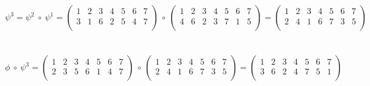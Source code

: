 $\psi^{3} = \psi^{2} \ \circ \ \psi^{1} = 
\begin{pmatrix}
1 & 2 & 3 & 4 & 5 & 6 & 7\\
3 & 1 & 6 & 2 & 5 & 4 & 7\\
\end{pmatrix} \ \circ \
\begin{pmatrix}
1 & 2 & 3 & 4 & 5 & 6 & 7\\
4 & 6 & 2 & 3 & 7 & 1 & 5\\
\end{pmatrix} =
\begin{pmatrix}
1 & 2 & 3 & 4 & 5 & 6 & 7\\
2 & 4 & 1 & 6 & 7 & 3 & 5\\
\end{pmatrix}$\\~\\~\\

$\phi \ \circ \ \psi^{3} =
\begin{pmatrix}
1 & 2 & 3 & 4 & 5 & 6 & 7\\
2 & 3 & 5 & 6 & 1 & 4 & 7\\
\end{pmatrix} \ \circ \
\begin{pmatrix}
1 & 2 & 3 & 4 & 5 & 6 & 7\\
2 & 4 & 1 & 6 & 7 & 3 & 5\\
\end{pmatrix}
= 
\begin{pmatrix}
1 & 2 & 3 & 4 & 5 & 6 & 7\\
3 & 6 & 2 & 4 & 7 & 5 & 1\\
\end{pmatrix}$\\

